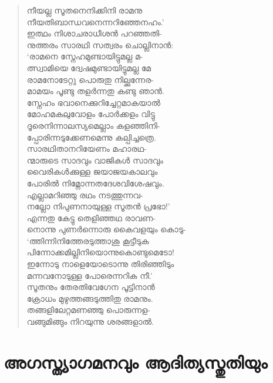 \begin{verse}
നീയല്ല സൂതനെനിക്കിനി രാമനു\\
നീയതിബാന്ധവനെന്നറിഞ്ഞേനഹം.’\\
ഇത്ഥം നിശാചരാധീശന്‍ പറഞ്ഞതി-\\
നുത്തരം സാരഥി സത്വരം ചൊല്ലിനാന്‍:\\
‘രാമനെ സ്നേഹമുണ്ടായിട്ടുമല്ല മ-\\
ത്സ്വാമിയെ ദ്വേഷമുണ്ടായിട്ടുമല്ല മേ\\
രാമനോടേറ്റു പൊരുതു നില്ക്കുന്നേര-\\
മാമയം പൂണ്ടു തളര്‍ന്നതു കണ്ടു ഞാന്‍.\\
സ്നേഹം ഭവാനെക്കുറിച്ചേറ്റമാകയാല്‍\\
മോഹമകലുവോളം പോര്‍ക്കളം വിട്ടു\\
ദൂരെനിന്നാലസ്യമെല്ലാം കളഞ്ഞിനി-\\
പ്പോരിന്നടുക്കേണമെന്നു കല്പിച്ചത്രെ.\\
സാരഥിതാനറിയേണം മഹാരഥ-\\
ന്മാരുടെ സാദവും വാജികള്‍ സാദവും\\
വൈരികള്‍ക്കുള്ള ജയാജയകാലവും\\
പോരില്‍ നിമ്നോന്നതദേശവിശേഷവും.\\
എല്ലാമറിഞ്ഞു രഥം നടത്തുന്നവ-\\
നല്ലോ നിപുണനായുള്ള സൂതന്‍ പ്രഭോ!’\\
എന്നതു കേട്ടു തെളിഞ്ഞഥ രാവണ-\\
നൊന്നു പുണര്‍ന്നൊരു കൈവളയും കൊടു-\\
‘ത്തിന്നിനിത്തേരടുത്താശു കൂട്ടീടുക\\
പിന്നോക്കമില്ലിനിയൊന്നുകൊണ്ടുമെടോ!\\
ഇന്നോടു നാളെയോടൊന്നു തിരിഞ്ഞിടും\\
മന്നവനോടുള്ള പോരെന്നറിക നീ.’\\
സൂതനും തേരതിവേഗേന പൂട്ടിനാന്‍\\
ക്രോധം മുഴുത്തങ്ങടുത്തിതു രാമനും.\\
തങ്ങളിലേറ്റമണഞ്ഞു പൊരുന്നള-\\
വങ്ങുമിങ്ങും നിറയുന്നു ശരങ്ങളാല്‍.
\end{verse}


\section{അഗസ്ത്യാഗമനവും ആദിത്യസ്തുതിയും}

